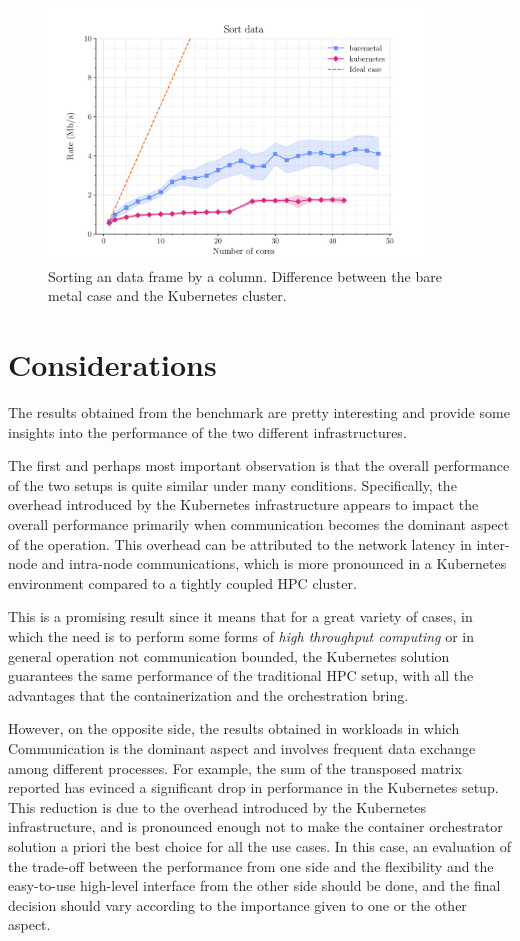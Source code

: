 \begin{figure}
  \centering
  \includegraphics[width=0.9\textwidth]{img/chpt4/df-order-data}
  \caption{Sorting an data frame by a column. Difference between the bare metal
    case and the Kubernetes cluster.}
  \label{fig:dataframe-sort}
\end{figure}

\section{Considerations}

The results obtained from the benchmark are pretty interesting and provide some
insights into the performance of the two different infrastructures.

The first and perhaps most important observation is that the overall performance
of the two setups is quite similar under many conditions.
Specifically, the overhead introduced by the Kubernetes infrastructure appears
to impact the overall performance primarily when communication becomes the
dominant aspect of the operation. This overhead can be attributed to the network
latency in inter-node and intra-node communications, which is more pronounced in
a Kubernetes environment compared to a tightly coupled HPC cluster.

This is a promising result since it means that for a great variety of cases, in
which the need is to perform some forms of \textit{high throughput computing} or
in general operation not communication bounded, the Kubernetes solution
guarantees the same performance of the traditional HPC setup, with all the
advantages that the containerization and the orchestration bring.

However, on the opposite side, the results obtained in workloads in which
Communication is the dominant aspect and involves frequent data exchange among
different processes. For example, the sum of the transposed matrix reported has
evinced a significant drop in performance in the Kubernetes setup.
This reduction is due to the overhead introduced by the Kubernetes
infrastructure, and is pronounced enough not to make the container orchestrator
solution a priori the best choice for all the use cases.
In this case, an evaluation of the trade-off between the performance from one
side and the flexibility and the easy-to-use high-level interface from the other
side should be done, and the final decision should vary according to the
importance given to one or the other aspect.

